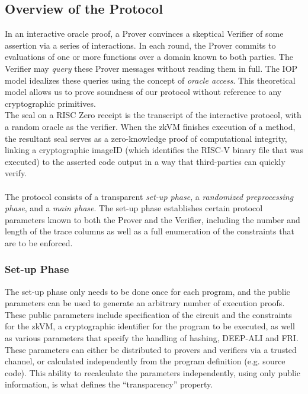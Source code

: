 \documentclass[10pt,letterpaper,titlepage]{article}
\theoremstyle{definition}
\begin{document}
\subsection{Overview of the Protocol}
In an interactive oracle proof, a Prover convinces a skeptical Verifier of some assertion via a series of interactions.
In each round, the Prover commits to evaluations of one or more functions over a domain known to both parties.
The Verifier may \textit{query} these Prover messages without reading them in full.
The IOP model idealizes these queries using the concept of \textit{oracle access}.
This theoretical model allows us to prove soundness of our protocol without reference to any cryptographic primitives.%
\\
The seal on a RISC Zero receipt is the transcript of the interactive protocol, with a random oracle as the verifier.
When the zkVM finishes execution of a method, the resultant seal serves as a zero-knowledge proof of computational integrity, linking a cryptographic imageID (which identifies the RISC-V binary file that was executed) to the asserted code output in a way that third-parties can quickly verify.\\
\\
The protocol consists of a transparent \textit{set-up phase}, a \textit{randomized preprocessing phase}, and a \textit{main phase}.
The set-up phase establishes certain protocol parameters known to both the Prover and the Verifier, including the number and length of the trace columns as well as a full enumeration of the constraints that are to be enforced.

\subsubsection{Set-up Phase}
The set-up phase only needs to be done once for each program, and the public parameters can be used to generate an arbitrary number of execution proofs.
These public parameters include specification of the circuit and the constraints for the zkVM, a cryptographic identifier for the program to be executed, as well as various parameters that specify the handling of hashing, DEEP-ALI and FRI.
These parameters can either be distributed to provers and verifiers via a trusted channel, or calculated independently from the program definition (e.g. source code).
This ability to recalculate the parameters independently, using only public information, is what defines the ``transparency'' property.
\end{document}
